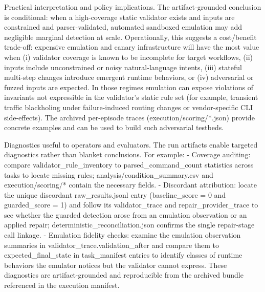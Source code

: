 \documentclass[conference]{IEEEtran}
\begin{document}
Practical interpretation and policy implications. The artifact-grounded conclusion is conditional: when a high-coverage static validator exists and inputs are constrained and parser-validated, automated sandboxed emulation may add negligible marginal detection at scale. Operationally, this suggests a cost/benefit trade-off: expensive emulation and canary infrastructure will have the most value when (i) validator coverage is known to be incomplete for target workflows, (ii) inputs include unconstrained or noisy natural-language intents, (iii) stateful multi-step changes introduce emergent runtime behaviors, or (iv) adversarial or fuzzed inputs are expected. In those regimes emulation can expose violations of invariants not expressible in the validator's static rule set (for example, transient traffic blackholing under failure-induced routing changes or vendor-specific CLI side-effects). The archived per-episode traces (execution/scoring/*.json) provide concrete examples and can be used to build such adversarial testbeds.

Diagnostics useful to operators and evaluators. The run artifacts enable targeted diagnostics rather than blanket conclusions. For example:
- Coverage auditing: compare validator\_rule\_inventory to parsed\_command\_count statistics across tasks to locate missing rules; analysis/condition\_summary.csv and execution/scoring/* contain the necessary fields.
- Discordant attribution: locate the unique discordant raw\_results.jsonl entry (baseline\_score = 0 and guarded\_score = 1) and follow its validator\_trace and repair\_provider\_trace to see whether the guarded detection arose from an emulation observation or an applied repair; deterministic\_reconciliation.json confirms the single repair-stage call linkage.
- Emulation fidelity checks: examine the emulation observation summaries in validator\_trace.validation\_after and compare them to expected\_final\_state in task\_manifest entries to identify classes of runtime behaviors the emulator notices but the validator cannot express.
These diagnostics are artifact-grounded and reproducible from the archived bundle referenced in the execution manifest.
\end{document}
